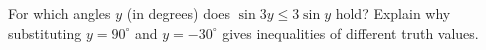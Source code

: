 For which angles $y$ (in degrees) does $\sin3y\le3\sin y$ hold? Explain why substituting $y=90^\circ$ and $y=-30^\circ$ gives inequalities of different truth values.
